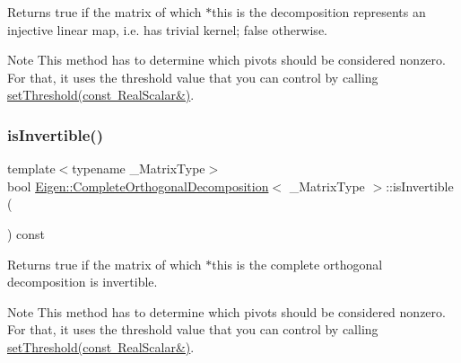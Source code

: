 \begin{DoxyReturn}{Returns}
true if the matrix of which $\ast$this is the decomposition represents an injective linear map, i.\+e. has trivial kernel; false otherwise.
\end{DoxyReturn}
\begin{DoxyNote}{Note}
This method has to determine which pivots should be considered nonzero. For that, it uses the threshold value that you can control by calling \mbox{\hyperlink{class_eigen_1_1_complete_orthogonal_decomposition_aa9c9f7cbde9d58ca5552381b70ad8d82}{set\+Threshold(const Real\+Scalar\&)}}. 
\end{DoxyNote}
\mbox{\label{class_eigen_1_1_complete_orthogonal_decomposition_a7c4f24f868295349a3bb99e5f217b069}} 
\subsubsection{\texorpdfstring{isInvertible()}{isInvertible()}}
{\footnotesize\ttfamily template$<$typename \+\_\+\+Matrix\+Type$>$ \\
bool \mbox{\hyperlink{class_eigen_1_1_complete_orthogonal_decomposition}{Eigen\+::\+Complete\+Orthogonal\+Decomposition}}$<$ \+\_\+\+Matrix\+Type $>$\+::is\+Invertible (\begin{DoxyParamCaption}{ }\end{DoxyParamCaption}) const\hspace{0.3cm}{\ttfamily [inline]}}

\begin{DoxyReturn}{Returns}
true if the matrix of which $\ast$this is the complete orthogonal decomposition is invertible.
\end{DoxyReturn}
\begin{DoxyNote}{Note}
This method has to determine which pivots should be considered nonzero. For that, it uses the threshold value that you can control by calling \mbox{\hyperlink{class_eigen_1_1_complete_orthogonal_decomposition_aa9c9f7cbde9d58ca5552381b70ad8d82}{set\+Threshold(const Real\+Scalar\&)}}. 
\end{DoxyNote}
\mbox{\label{class_eigen_1_1_complete_orthogonal_decomposition_a53dd287d3e1bbc548595d63880fd51bf}} 
